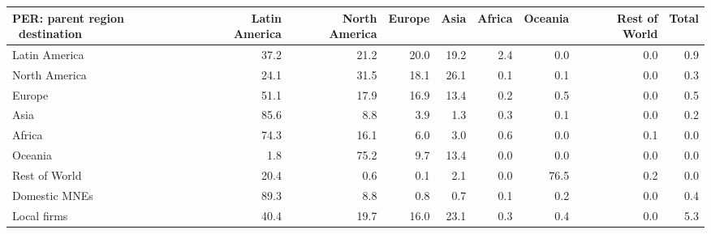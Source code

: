 \begin{tabular}{lrrrrrrrr}
\toprule
PER: parent region \ destination & Latin America & North America & Europe & Asia & Africa & Oceania & Rest of World & Total \\
\midrule
Latin America & 37.2 & 21.2 & 20.0 & 19.2 & 2.4 & 0.0 & 0.0 & 0.9 \\
North America & 24.1 & 31.5 & 18.1 & 26.1 & 0.1 & 0.1 & 0.0 & 0.3 \\
Europe & 51.1 & 17.9 & 16.9 & 13.4 & 0.2 & 0.5 & 0.0 & 0.5 \\
Asia & 85.6 & 8.8 & 3.9 & 1.3 & 0.3 & 0.1 & 0.0 & 0.2 \\
Africa & 74.3 & 16.1 & 6.0 & 3.0 & 0.6 & 0.0 & 0.1 & 0.0 \\
Oceania & 1.8 & 75.2 & 9.7 & 13.4 & 0.0 & 0.0 & 0.0 & 0.0 \\
Rest of World & 20.4 & 0.6 & 0.1 & 2.1 & 0.0 & 76.5 & 0.2 & 0.0 \\
Domestic MNEs & 89.3 & 8.8 & 0.8 & 0.7 & 0.1 & 0.2 & 0.0 & 0.4 \\
Local firms & 40.4 & 19.7 & 16.0 & 23.1 & 0.3 & 0.4 & 0.0 & 5.3 \\
\bottomrule
\end{tabular}
